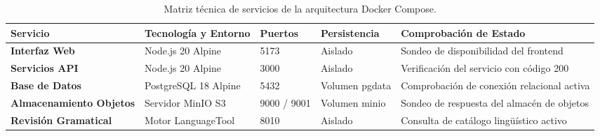 \documentclass[12pt,a4paper]{article}
\begin{document}
\begin{table}[H]
\centering
\small
\renewcommand{\arraystretch}{1.2}
\begin{tabularx}{\textwidth}{|>{\hsize=0.8\hsize\raggedright\arraybackslash\bfseries\footnotesize}X|>{\hsize=0.8\hsize\raggedright\arraybackslash\footnotesize}X|>{\hsize=0.6\hsize\centering\arraybackslash\footnotesize}X|>{\hsize=0.6\hsize\centering\arraybackslash\footnotesize}X|>{\hsize=1.2\hsize\raggedright\arraybackslash\footnotesize}X|}
\hline
\rowcolor{tableheader}
\textbf{Servicio} & \textbf{Tecnología y Entorno} & \textbf{Puertos} & \textbf{Persistencia} & \textbf{Comprobación de Estado} \\
\hline
Interfaz Web & Node.js 20 Alpine & 5173 & Aislado & Sondeo de disponibilidad del frontend \\
\hline
Servicios API & Node.js 20 Alpine & 3000 & Aislado & Verificación del servicio con código 200 \\
\hline
Base de Datos & PostgreSQL 18 Alpine & 5432 & Volumen pgdata & Comprobación de conexión relacional activa \\
\hline
Almacenamiento Objetos & Servidor MinIO S3 & 9000 / 9001 & Volumen minio & Sondeo de respuesta del almacén de objetos \\
\hline
Revisión Gramatical & Motor LanguageTool & 8010 & Aislado & Consulta de catálogo lingüístico activo \\
\hline
\end{tabularx}
\caption{Matriz técnica de servicios de la arquitectura Docker Compose.}
\label{tab:docker_matrix}
\end{table}
\end{document}
